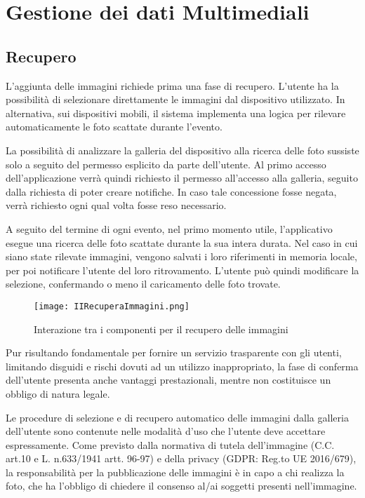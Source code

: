 \section{Gestione dei dati Multimediali}
	
\clearpage

	
\subsection{ Recupero} 

L’aggiunta delle immagini richiede prima una fase di recupero. L’utente ha la possibilità di selezionare direttamente le immagini dal dispositivo utilizzato. In alternativa, sui dispositivi mobili, il sistema implementa una logica per rilevare automaticamente le foto scattate durante l’evento.

La possibilità di analizzare la galleria del dispositivo alla ricerca delle foto sussiste solo a seguito del permesso esplicito da parte dell’utente. Al primo accesso dell’applicazione verrà quindi richiesto il permesso all'accesso alla galleria, seguito dalla richiesta di poter creare notifiche. In caso tale concessione fosse negata, verrà richiesto ogni qual volta fosse reso necessario.

A seguito del termine di ogni evento, nel primo momento utile, l’applicativo esegue una ricerca delle foto scattate durante la sua intera durata. Nel caso in cui siano state rilevate immagini, vengono salvati i loro riferimenti in memoria locale, per poi notificare l’utente del loro ritrovamento. L’utente può quindi modificare la selezione, confermando o meno il caricamento delle foto trovate.



\begin{figure}[h!]
    \centering
    \texttt{[image: IIRecuperaImmagini.png]}
    \caption{Interazione tra i componenti per il recupero delle immagini}
\end{figure}	





Pur risultando fondamentale per fornire un servizio trasparente con gli utenti, limitando disguidi e rischi dovuti ad un utilizzo inappropriato, la fase di conferma dell’utente presenta anche vantaggi prestazionali, mentre non costituisce un obbligo di natura legale. 

Le procedure di selezione e di recupero automatico delle immagini dalla galleria dell’utente sono contenute nelle modalità d’uso che l’utente deve accettare espressamente. Come previsto dalla normativa di tutela dell’immagine (C.C. art.10 e L. n.633/1941 artt. 96-97) e della privacy (GDPR: Reg.to UE 2016/679), la responsabilità per la pubblicazione delle immagini è in capo a chi realizza la foto, che ha l’obbligo di chiedere il consenso al/ai soggetti presenti nell’immagine. 


